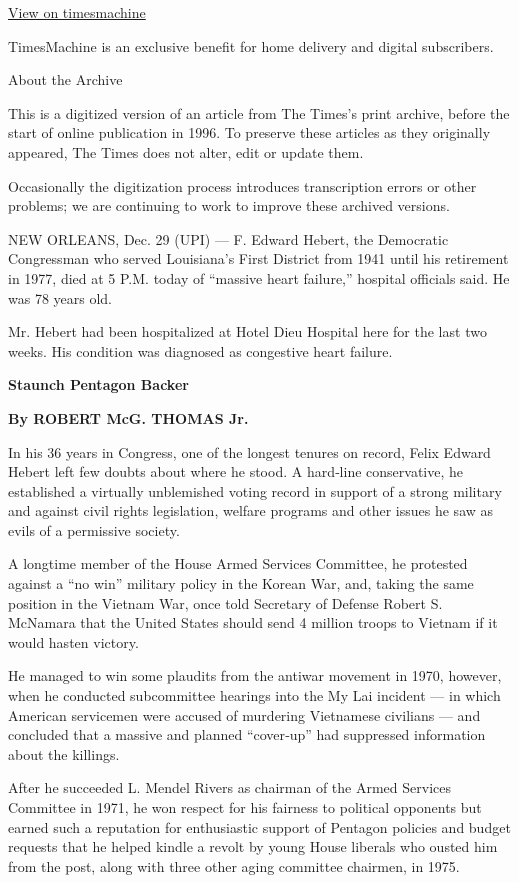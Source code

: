 \href{http://timesmachine.nytimes3xbfgragh.onion/timesmachine/1979/12/30/111213872.html}{View
on timesmachine}

TimesMachine is an exclusive benefit for home delivery and digital
subscribers.

About the Archive

This is a digitized version of an article from The Times's print
archive, before the start of online publication in 1996. To preserve
these articles as they originally appeared, The Times does not alter,
edit or update them.

Occasionally the digitization process introduces transcription errors or
other problems; we are continuing to work to improve these archived
versions.

NEW ORLEANS, Dec. 29 (UPI) --- F. Edward Hebert, the Democratic
Congressman who served Louisiana's First District from 1941 until his
retirement in 1977, died at 5 P.M. today of ``massive heart failure,''
hospital officials said. He was 78 years old.

Mr. Hebert had been hospitalized at Hotel Dieu Hospital here for the
last two weeks. His condition was diagnosed as congestive heart failure.

\textbf{Staunch Pentagon Backer}

\textbf{By ROBERT McG. THOMAS Jr.}

In his 36 years in Congress, one of the longest tenures on record, Felix
Edward Hebert left few doubts about where he stood. A hard‐line
conservative, he established a virtually unblemished voting record in
support of a strong military and against civil rights legislation,
welfare programs and other issues he saw as evils of a permissive
society.

A longtime member of the House Armed Services Committee, he protested
against a ``no win'' military policy in the Korean War, and, taking the
same position in the Vietnam War, once told Secretary of Defense Robert
S. McNamara that the United States should send 4 million troops to
Vietnam if it would hasten victory.

He managed to win some plaudits from the antiwar movement in 1970,
however, when he conducted subcommittee hearings into the My Lai
incident --- in which American servicemen were accused of murdering
Vietnamese civilians --- and concluded that a massive and planned
``cover‐up'' had suppressed information about the killings.

After he succeeded L. Mendel Rivers as chairman of the Armed Services
Committee in 1971, he won respect for his fairness to political
opponents but earned such a reputation for enthusiastic support of
Pentagon policies and budget requests that he helped kindle a revolt by
young House liberals who ousted him from the post, along with three
other aging committee chairmen, in 1975.

